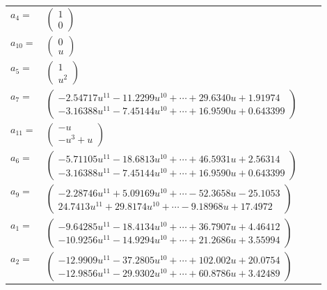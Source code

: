 \documentclass[1p]{elsarticle_modified}
\theoremstyle{definition}
\begin{document}
\begin{tabular}{m{7pt} m{180pt} m{7pt} m{180pt} }
\flushright $a_{4}=$&$\begin{pmatrix}1\\0\end{pmatrix}$ \\
\flushright $a_{10}=$&$\begin{pmatrix}0\\u\end{pmatrix}$ \\
\flushright $a_{5}=$&$\begin{pmatrix}1\\u^2\end{pmatrix}$ \\
\flushright $a_{7}=$&$\begin{pmatrix}-2.54717 u^{11}-11.2299 u^{10}+\cdots+29.6340 u+1.91974\\-3.16388 u^{11}-7.45144 u^{10}+\cdots+16.9590 u+0.643399\end{pmatrix}$ \\
\flushright $a_{11}=$&$\begin{pmatrix}- u\\- u^3+u\end{pmatrix}$ \\
\flushright $a_{6}=$&$\begin{pmatrix}-5.71105 u^{11}-18.6813 u^{10}+\cdots+46.5931 u+2.56314\\-3.16388 u^{11}-7.45144 u^{10}+\cdots+16.9590 u+0.643399\end{pmatrix}$ \\
\flushright $a_{9}=$&$\begin{pmatrix}-2.28746 u^{11}+5.09169 u^{10}+\cdots-52.3658 u-25.1053\\24.7413 u^{11}+29.8174 u^{10}+\cdots-9.18968 u+17.4972\end{pmatrix}$ \\
\flushright $a_{1}=$&$\begin{pmatrix}-9.64285 u^{11}-18.4134 u^{10}+\cdots+36.7907 u+4.46412\\-10.9256 u^{11}-14.9294 u^{10}+\cdots+21.2686 u+3.55994\end{pmatrix}$ \\
\flushright $a_{2}=$&$\begin{pmatrix}-12.9909 u^{11}-37.2805 u^{10}+\cdots+102.002 u+20.0754\\-12.9856 u^{11}-29.9302 u^{10}+\cdots+60.8786 u+3.42489\end{pmatrix}$ \\

\end{tabular}
\end{document}
